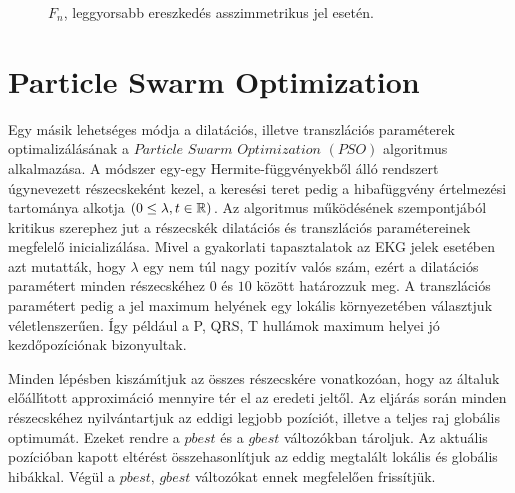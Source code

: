 \documentclass[oneside,titlepage,12pt,a4paper]{report}
\begin{document}
\begin{figure}[h]
\caption{$F_n$, leggyorsabb ereszked\'es asszimmetrikus jel eset\'en.}
\label{fig:ersz2}
\end{figure}


\section{Particle Swarm Optimization}
Egy másik lehets\'eges m\'odja a dilat\'aci\'os, illetve transzl\'aci\'os param\'eterek optimaliz\'al\'as\'anak a $Particle$ $Swarm$ $Optimization$ $(PSO)$ algoritmus alkalmaz\'asa. A módszer egy-egy Hermite-f\"uggv\'enyekb\H ol \'all\'o rendszert \'ugynevezett r\'eszecskek\'ent kezel, a keres\'esi teret pedig a hibaf\"uggv\'eny \'ertelmez\'esi tartom\'anya alkotja $( 0 \le \lambda, t\in \Bbb R)$. Az algoritmus
m\H uk\"od\'es\'enek szempontj\'ab\'ol kritikus szerephez jut a r\'eszecsk\'ek dilat\'aci\'os \'es transzl\'aci\'os param\'etereinek megfelel\H o  inicializ\'al\'asa. Mivel a gyakorlati tapasztalatok az EKG jelek esetében azt mutatták, hogy $\lambda$ egy nem túl nagy pozitív valós szám, ezért a dilat\'aci\'os param\'etert minden r\'eszecsk\'ehez $0$ \'es $10$ k\"oz\"ott  hat\'arozzuk meg. A
transzl\'aci\'os param\'etert pedig a jel maximum hely\'enek egy lokális k\"ornyezet\'eben v\'alasztjuk v\'eletlenszer\H uen. Így például a P, QRS, T hullámok maximum helyei jó kezdőpozíciónak bizonyultak. \par
Minden l\'ep\'esben kisz\'am\'\i tjuk az \"osszes
r\'eszecsk\'ere vonatkoz\'oan, hogy az \'altaluk el\H o\'all\'\i tott approxim\'aci\'o mennyire t\'er el az
eredeti jelt\H ol. Az eljárás során minden részecskéhez nyilvántartjuk az eddigi legjobb pozíciót, illetve a teljes raj globális optimumát. Ezeket rendre a $pbest$ és a $gbest$ változókban tároljuk. Az aktuális pozícióban kapott eltérést összehasonlítjuk az eddig megtalált lokális és globális hibákkal. Végül a $pbest,\, gbest$ változókat ennek megfelelően frissítjük.
\end{document}
